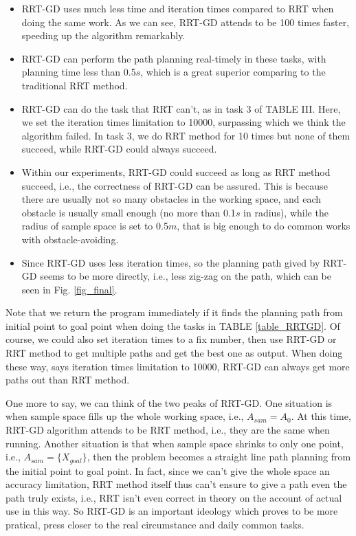 \documentclass[letterpaper, 10 pt, conference]{ieeeconf}  %
\begin{document}
\begin{itemize}

\item RRT-GD uses much less time and iteration times compared to RRT when doing the same work. As we can see, RRT-GD attends to be 100 times faster, speeding up the algorithm remarkably.
\item RRT-GD can perform the path planning real-timely in these tasks, with planning time less than 0.5$s$, which is a great superior comparing to the traditional RRT method.

\item RRT-GD can do the task that RRT can't, as in task 3 of TABLE III. Here, we set the iteration times limitation to 10000,  surpassing which we think the algorithm failed. In task 3, we do RRT method for 10 times but none of them succeed, while RRT-GD could always succeed.
\item Within our experiments, RRT-GD could succeed as long as RRT method succeed, i.e., the correctness of RRT-GD can be assured. This is because there are usually not so many obstacles in the working space, and each obstacle is usually small enough (no more than 0.1$s$ in radius), while the radius of sample space is set to 0.5$m$, that is big enough to do common works with obstacle-avoiding.
\item Since RRT-GD uses less iteration times, so the planning path gived by RRT-GD seems to be more directly, i.e., less zig-zag on the path, which can be seen in Fig. \ref{fig_final}.

\end{itemize}

Note that we return the program immediately if it finds the planning path from initial point to goal point when doing the tasks in TABLE \ref{table_RRTGD}. Of course, we could also set iteration times to a fix number, then use RRT-GD or RRT method to get multiple paths and get the best one as output. When doing these way, says iteration times limitation to 10000, RRT-GD can always get more paths out than RRT method.

One more to say, we can think of the two peaks of RRT-GD. One situation is when sample space fills up the whole working space, i.e., $A_{sam} = A_{0}$. At this time, RRT-GD algorithm attends to be RRT method, i.e., they are the same when running. Another situation is that when sample space shrinks to only one point, i.e., $A_{sam} = \{X_{goal}\}$, then the problem becomes a straight line path planning from the initial point to goal point. In fact, since we can't give the whole space an accuracy limitation, RRT method itself thus can't ensure to give a path even the path truly exists, i.e., RRT isn't even correct in theory on the account of actual use in this way. So RRT-GD is an important ideology which proves to be more pratical, press closer to the real circumstance and daily common tasks.
\end{document}
